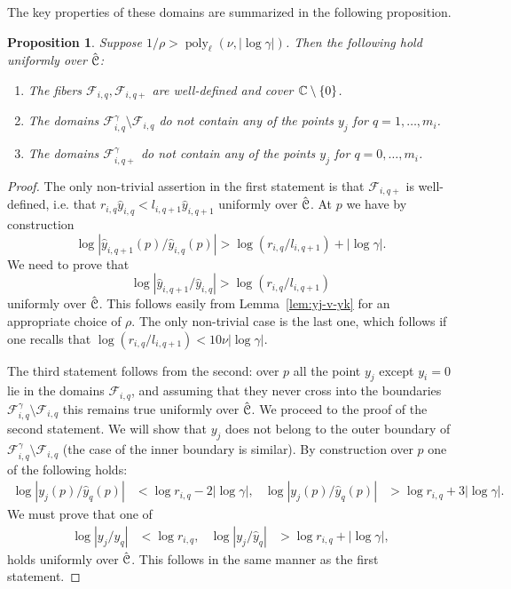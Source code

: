 \documentclass[reqno]{amsart}
\newtheorem{Prop}[Cor]{Proposition}{\bfseries}{\itshape}
\renewcommand\~[1]{\widetilde{#1}}
\def\poly{\operatorname{poly}} \def\J{\operatorname{J}}
\def\cF{{\mathcal F}} \def\cL{{\mathcal L}} \def\cR{{\mathcal R}}
\begin{document}
The key properties of these domains are summarized in the following
proposition.
\begin{Prop}\label{prop:clusters}
  Suppose $1/\rho>\poly_\ell(\nu,|\log\gamma|)$. Then the following hold
  uniformly over $\hat{{\mathcal C}}$:
  \begin{enumerate}
  \item The fibers $\cF_{i,q},\cF_{i,q+}$ are well-defined and cover
    ${\mathbb C}\setminus\{0\}$.
  \item The domains $\cF_{i,q}^\gamma\setminus\cF_{i,q}$ do not contain any
    of the points $y_j$ for $q=1,\ldots,m_i$.
  \item The domains $\cF_{i,q+}^\gamma$ do not contain any of the
    points $y_j$ for $q=0,\ldots,m_i$.
  \end{enumerate}
\end{Prop}
\begin{proof}
  The only non-trivial assertion in the first statement is that
  $\cF_{i,q+}$ is well-defined, i.e. that
  $r_{i,q}\hat y_{i,q}<l_{i,q+1}\hat y_{i,q+1}$ uniformly over
  $\hat{{\mathcal C}}$. At $p$ we have by construction
  \begin{equation}
    \log |\hat y_{i,q+1}(p)/\hat y_{i,q}(p)| > \log(r_{i,q}/l_{i,q+1})+|\log\gamma|.
  \end{equation}
  We need to prove that
  \begin{equation}
    \log |\hat y_{i,q+1}/\hat y_{i,q}| > \log(r_{i,q}/l_{i,q+1})
  \end{equation}
  uniformly over $\hat{{\mathcal C}}$. This follows easily from
  Lemma~\ref{lem:yj-v-yk} for an appropriate choice of $\rho$. The
  only non-trivial case is the last one, which follows if one recalls
  that $\log(r_{i,q}/l_{i,q+1})<10\nu|\log\gamma|$.
  
  The third statement follows from the second: over $p$ all the point
  $y_j$ except $y_i=0$ lie in the domains $\cF_{i,q}$, and assuming
  that they never cross into the boundaries
  $\cF_{i,q}^\gamma\setminus\cF_{i,q}$ this remains true uniformly
  over $\hat{{\mathcal C}}$. We proceed to the proof of the second statement. We
  will show that $y_j$ does not belong to the outer boundary of
  $\cF_{i,q}^\gamma\setminus\cF_{i,q}$ (the case of the inner boundary
  is similar). By construction over $p$ one of the following holds:
  \begin{align}
     \log|y_j(p)/\hat y_q(p)|&< \log r_{i,q}-2|\log\gamma|, &  \log|y_j(p)/\hat y_q(p)|&> \log r_{i,q}+3|\log\gamma|.
  \end{align}
  We must prove that one of
  \begin{align}
     \log|y_j/\hat y_q|&< \log r_{i,q}, &  \log|y_j/\hat y_q|&> \log r_{i,q}+|\log\gamma|,
  \end{align}
  holds uniformly over $\hat{{\mathcal C}}$. This follows in the same manner as
  the first statement.
\end{proof}
\end{document}
